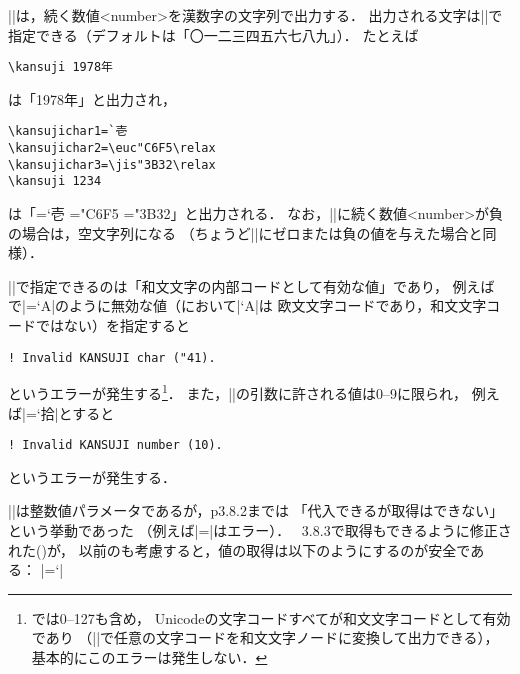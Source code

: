 \documentclass[a4paper,11pt,nomag,dvipdfmx]{jsarticle}
\begin{document}
\begin{cslist}
\csitem[\.{kansuji} <number>, \.{kansujichar} <0--9>=<kanji code>]
  |\kansuji|は，続く数値<number>を漢数字の文字列で出力する．
  出力される文字は|\kansujichar|で指定できる（デフォルトは「〇一二三四五六七八九」）．
  たとえば
\begin{verbatim}
\kansuji 1978年
\end{verbatim}
  は「\kansuji 1978年」と出力され，
\begin{verbatim}
\kansujichar1=`壱
\kansujichar2=\euc"C6F5\relax
\kansujichar3=\jis"3B32\relax
\kansuji 1234
\end{verbatim}
  は「{=`壱 =\euc"C6F5\relax
       =\jis"3B32\relax {}}」と出力される．
  なお，|\kansuji|に続く数値<number>が負の場合は，空文字列になる
  （ちょうど|\romannumeral|にゼロまたは負の値を与えた場合と同様）．

  |\kansujichar|で指定できるのは「和文文字の内部コードとして有効な値」であり，
  例えば\pTeX で|=`A|のように無効な値（\pTeX において|`A|は
  欧文文字コードであり，和文文字コードではない）を指定すると
\begin{verbatim}
! Invalid KANSUJI char ("41).
\end{verbatim}
  というエラーが発生する\footnote{\upTeX では0--127も含め，
  Unicodeの文字コードすべてが和文文字コードとして有効であり
  （|\kchar|で任意の文字コードを和文文字ノードに変換して出力できる），
  基本的にこのエラーは発生しない．}．
  また，|\kansujichar|の引数に許される値は0--9に限られ，
  例えば|=`拾|とすると
\begin{verbatim}
! Invalid KANSUJI number (10).
\end{verbatim}
  というエラーが発生する．
\end{cslist}

\begin{dangerous}
  |\kansujichar|は整数値パラメータであるが，p3.8.2までは
  「代入できるが取得はできない」という挙動であった
  （例えば|=|はエラー）．
  \pTeX~3.8.3で取得もできるように修正された(\cite{tjb93})が，
  以前の\pTeX も考慮すると，値の取得は以下のようにするのが安全である：
  |=\expandafter`|
\end{dangerous}
\end{document}
